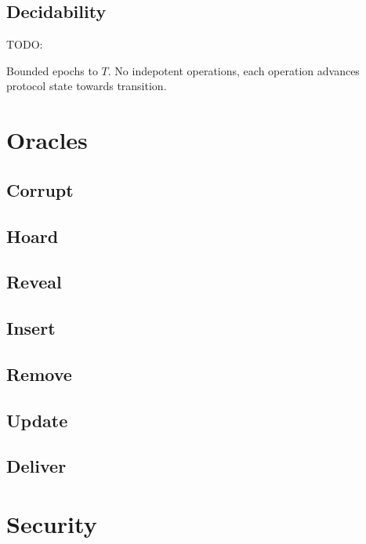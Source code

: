 \hypertarget{decidability}{%
\subsection{Decidability}\label{decidability}}

TODO:

Bounded epochs to \(T\).
No indepotent operations, each operation advances protocol state towards transition.


\hypertarget{sec:game-oracles}{%
\section{Oracles}\label{sec:game-oracles}}


\hypertarget{corrupt}{%
\subsection{Corrupt}\label{corrupt}}


\hypertarget{hoard}{%
\subsection{Hoard}\label{hoard}}


\hypertarget{reveal}{%
\subsection{Reveal}\label{reveal}}


\hypertarget{insert}{%
\subsection{Insert}\label{insert}}


\hypertarget{remove}{%
\subsection{Remove}\label{remove}}


\hypertarget{update}{%
\subsection{Update}\label{update}}


\hypertarget{deliver}{%
\subsection{Deliver}\label{deliver}}


\hypertarget{sec:LTL-security}{%
\section{Security}\label{sec:LTL-security}}


